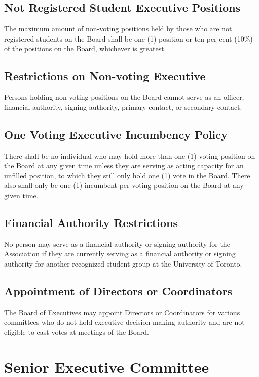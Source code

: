 \subsection{Not Registered Student Executive Positions}
The maximum amount of non-voting positions held by those who are not
registered students on the Board shall be one (1) position or ten 
per cent (10\%) of the positions on the Board, whichever is greatest.

\subsection{Restrictions on Non-voting Executive}
Persons holding non-voting positions on the Board cannot serve as an 
officer, financial authority, signing authority, primary contact, or 
secondary contact.

\subsection{One Voting Executive Incumbency Policy}
There shall be no individual who may hold more than one (1) voting 
position on the Board at any given time unless they are serving as
acting capacity for an unfilled position, to which they still only
hold one (1) vote in the Board. There also shall only 
be one (1) incumbent per voting position on the Board at any given 
time.
 
\subsection{Financial Authority Restrictions}
No person may serve as a financial authority or signing authority 
for the Association if they are currently serving as a financial 
authority or signing authority for another recognized student group 
at the University of Toronto.

\subsection{Appointment of Directors or Coordinators}
The Board of Executives may appoint Directors or Coordinators for 
various committees who do not hold executive decision-making 
authority and are not eligible to cast votes at meetings of the 
Board.

\section{Senior Executive Committee}

